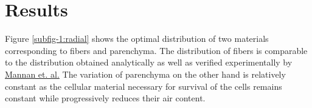 \documentclass[openright,twoside]{iitkthesis}
\begin{document}
\section{Results}
Figure \ref{subfig-1:radial} shows the optimal distribution of two materials corresponding to fibers and parenchyma. The distribution of fibers is comparable to the distribution obtained analytically as well as verified experimentally by \hyperref[mannan2017correlations]{Mannan et. al.}\cite{mannan2017correlations}
The variation of parenchyma on the other hand is relatively constant as the cellular material necessary for survival of the cells remains constant while progressively reduces their air content.
\begin{figure}[H]
\begin{center}
\end{center}
\end{figure}
\end{document}
